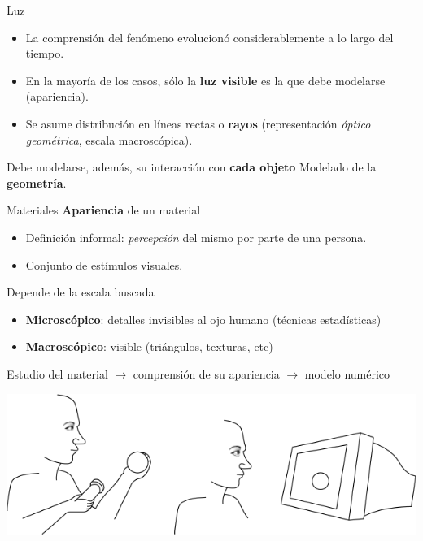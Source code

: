 \documentclass[spanish,unknownkeysallowed]{beamer}
\begin{document}
\begin{frame}[Luz]
\begin{block}{Luz}
\begin{itemize}
\item La comprensión del fenómeno evolucionó considerablemente a lo largo del tiempo.
\item En la mayoría de los casos, sólo la \textbf{luz visible} es la que debe modelarse (apariencia).
\item Se asume distribución en líneas rectas o \textbf{rayos} (representación {\em óptico geométrica}, escala macroscópica).
\end{itemize}
\end{block}

\begin{block}{Debe modelarse, además, su interacción con \textbf{cada objeto}}
Modelado de la \textbf{geometría}.
\end{block}

\end{frame}


\begin{frame}{Materiales}
\textbf{Apariencia} de un material
\begin{itemize}
\item Definición informal: {\em percepción} del mismo por parte de una persona.
\item Conjunto de estímulos visuales.
\end{itemize}

Depende de la escala buscada
\begin{itemize}
\item \textbf{Microscópico}: detalles invisibles al ojo humano (técnicas estadísticas)
\item \textbf{Macroscópico}: visible (triángulos, texturas, etc)
\end{itemize}

Estudio del material $\rightarrow$ comprensión de su apariencia $\rightarrow$ modelo numérico

\centerline{\includegraphics[scale = 0.25]{../figures/apariencia}}
\end{frame}
\end{document}
